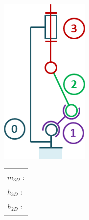 \documentclass[10pt,fleqn]{article} %
\begin{document}
\begin{multicols}{2}
\begin{minipage}[c]{.45\linewidth}
\begin{center}
\includegraphics[width=.8\linewidth]{images/cas_01.png}
\end{center}
\end{minipage} \hfill
\begin{minipage}[c]{.5\linewidth}
\begin{center}
\begin{tabular}{|p{3cm}|}
\hline 
\\
$m_{3D}$ : \\
\\
$h_{3D}$ : \\
\\
$h_{2D}$ : \\
\\
\hline
\end{tabular}
\end{center}
\end{minipage} 




\end{multicols}
\end{document}
